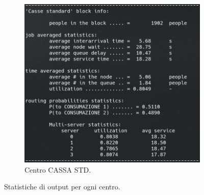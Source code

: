 \documentclass{article}
\begin{document}
\begin{figure}[H]
\begin{subfigure}{.5\textwidth}
  \includegraphics[width=.9\linewidth]{img/migliorativo_2_1/standard.png}
  \caption{Centro CASSA STD.}
  \label{fig:cassa_std_ext_2_pol_1}
\end{subfigure}
\caption{Statistiche di output per ogni centro.}
\label{fig:output_ext_2_pol_1}
\end{figure}
\end{document}
